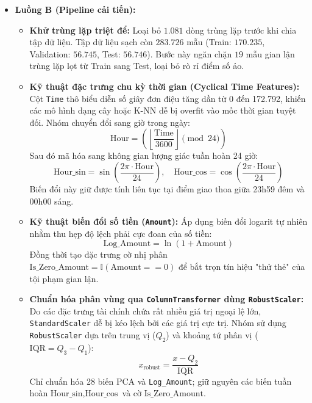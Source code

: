 \documentclass[13pt,a4paper]{extarticle}
\begin{document}
\begin{itemize}
    \item \textbf{Luồng B (Pipeline cải tiến):}
    \begin{itemize}
        \item \textbf{Khử trùng lặp triệt để:} Loại bỏ $1.081$ dòng trùng lặp trước khi chia tập dữ liệu. Tập dữ liệu sạch còn $283.726$ mẫu (Train: $170.235$, Validation: $56.745$, Test: $56.746$). Bước này ngăn chặn $19$ mẫu gian lận trùng lặp lọt từ Train sang Test, loại bỏ rò rỉ điểm số ảo.
        \item \textbf{Kỹ thuật đặc trưng chu kỳ thời gian (Cyclical Time Features):} Cột \texttt{Time} thô biểu diễn số giây đơn điệu tăng dần từ 0 đến 172.792, khiến các mô hình dạng cây hoặc K-NN dễ bị overfit vào mốc thời gian tuyệt đối. Nhóm chuyển đổi sang giờ trong ngày:
        \begin{equation}
        \text{Hour} = \left(\left\lfloor \frac{\text{Time}}{3600} \right\rfloor \pmod{24}\right)
        \end{equation}
        Sau đó mã hóa sang không gian lượng giác tuần hoàn 24 giờ:
        \begin{equation}
        \text{Hour\_sin} = \sin\left(\frac{2\pi \cdot \text{Hour}}{24}\right), \quad \text{Hour\_cos} = \cos\left(\frac{2\pi \cdot \text{Hour}}{24}\right)
        \end{equation}
        Biến đổi này giữ được tính liên tục tại điểm giao thoa giữa 23h59 đêm và 00h00 sáng.
        \item \textbf{Kỹ thuật biến đổi số tiền (\texttt{Amount}):} Áp dụng biến đổi logarit tự nhiên nhằm thu hẹp độ lệch phải cực đoan của số tiền:
        \begin{equation}
        \text{Log\_Amount} = \ln(1 + \text{Amount})
        \end{equation}
        Đồng thời tạo đặc trưng cờ nhị phân $\text{Is\_Zero\_Amount} = \mathbb{I}(\text{Amount} == 0)$ để bắt trọn tín hiệu "thử thẻ" của tội phạm gian lận.
        \item \textbf{Chuẩn hóa phân vùng qua \texttt{ColumnTransformer} dùng \texttt{RobustScaler}:} Do các đặc trưng tài chính chứa rất nhiều giá trị ngoại lệ lớn, \texttt{StandardScaler} dễ bị kéo lệch bởi các giá trị cực trị. Nhóm sử dụng \texttt{RobustScaler} dựa trên trung vị ($Q_2$) và khoảng tứ phân vị ($\text{IQR} = Q_3 - Q_1$):
        \begin{equation}
        x_{\text{robust}} = \frac{x - Q_2}{\text{IQR}}
        \end{equation}
        Chỉ chuẩn hóa 28 biến PCA và \texttt{Log\_Amount}; giữ nguyên các biến tuần hoàn $\text{Hour\_sin}, \text{Hour\_cos}$ và cờ $\text{Is\_Zero\_Amount}$.

\end{itemize}
\end{itemize}
\end{document}
